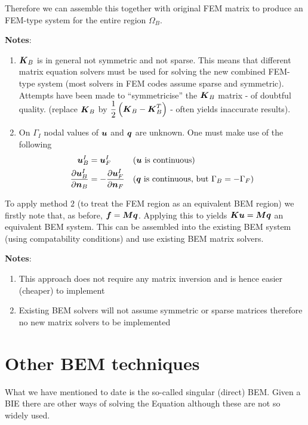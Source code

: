 Therefore we can assemble this together with original FEM matrix to produce an
FEM-type system for the entire region $\Omega_{B}$.

\textbf{Notes}:
\begin{enumerate}
\item $\matr{K}_{B}$ is in general not symmetric and not sparse.  This means
  that different matrix equation solvers must be used for solving the new
  combined FEM-type system (most solvers in FEM codes assume sparse and
  symmetric). Attempts have been made to ``symmetricise'' the $\matr{K}_{B}$
  matrix - of doubtful quality. (\eg replace $\matr{K}_{B}$ by 
  $\dfrac{1}{2}\pbrac{ \matr{K}_{B}-\matr{K}_{B}^{T}}$ - 
  often yields inaccurate results).
\item On $\Gamma_{I}$ nodal values of $\boldsymbol{u}$ and $\boldsymbol{q}$ are unknown.  One
  must make use of the following
  \begin{alignat*}{2}
    \boldsymbol{u}_{B}^{I} &= \boldsymbol{u}_{F}^{I} && \text{($\boldsymbol{u}$ is continuous)}
    \\  \dfrac{\partial \boldsymbol{u}_{B}^{I}}{\partial \boldsymbol{n}_{B}}  &= - \dfrac{\partial \boldsymbol{u}_{F}^{I}}{\partial \boldsymbol{n}_{F}}  && \text{($\boldsymbol{q}$ is continuous, but $\Gamma_{B} =
      -\Gamma_{F}$)}
  \end{alignat*}
\end{enumerate}

To apply method $2$ (\ie to treat the FEM region as an equivalent BEM region)
we firstly note that, as before, $\vectr{f}=\matr{M}\vectr{q}$. Applying this to
 yields $\matr{K}\vectr{u}=\matr{M}\vectr{q}$ an
equivalent BEM system.  This can be assembled into the existing BEM system
(using compatability conditions) and use existing BEM matrix solvers.

\textbf{Notes}:
\begin{enumerate}
\item This approach does not require any matrix inversion and is hence easier
  (cheaper) to implement
\item Existing BEM solvers will not assume symmetric or sparse matrices
  therefore no new matrix solvers to be implemented
\end{enumerate}

\section{Other BEM techniques}

What we have mentioned to date is the so-called singular (direct) BEM.  Given
a BIE there are other ways of solving the Equation although these are not so
widely used.

